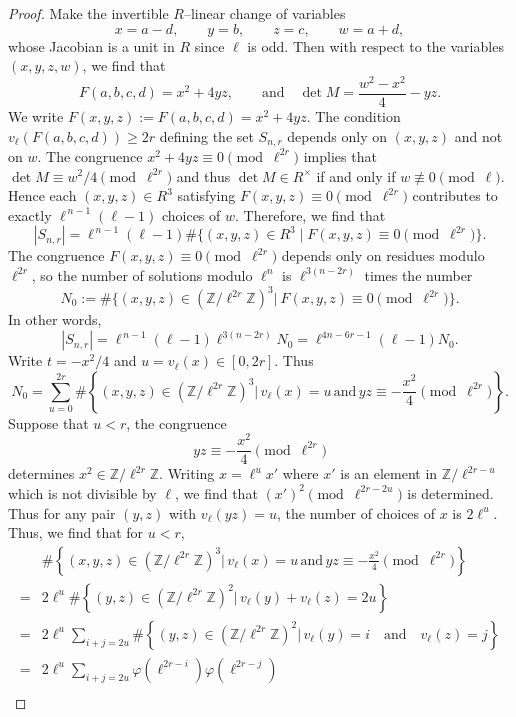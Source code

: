 \documentclass[10pt,a4paper]{amsart}
\newcommand{\Z}{\mathbb{Z}}
\begin{document}
\begin{proof}
Make the invertible $R$–linear change of variables
\[
x=a-d,\qquad y=b,\qquad z=c,\qquad w=a+d,
\]
whose Jacobian is a unit in $R$ since $\ell$ is odd. Then with respect to the variables $(x,y,z,w)$, we find that
\[
F(a,b,c,d)=x^2+4yz,
\qquad\text{and}\quad
\det M=\frac{w^2-x^2}{4}-yz.
\]
We write $F(x,y,z):=F(a,b,c,d)=x^2+4yz$. The condition $v_\ell\left(F(a,b,c,d)\right)\ge2r$ defining the set $S_{n,r}$ depends only on $(x,y,z)$ and not on $w$. The congruence $x^2+4yz\equiv0\pmod{\ell^{2r}}$ implies that $\det M\equiv w^2/4\pmod{\ell^{2r}}$ and thus $\det M\in R^\times$ if and only if $w\not\equiv0\pmod\ell$.  Hence each
$(x,y,z)\in R^3$ satisfying $F(x,y,z)\equiv 0\pmod{\ell^{2r}}$ contributes to exactly $\ell^{\,n-1}(\ell-1)$ choices of $w$. Therefore, we find that
\[|S_{n,r}|=\ell^{\,n-1}(\ell-1)\#\{(x,y,z)\in R^3\mid F(x,y,z)\equiv 0\pmod{\ell^{2r}}\}.\]
\noindent The congruence $F(x,y,z)\equiv0\pmod{\ell^{2r}}$ depends only on residues
modulo $\ell^{2r}$, so the number of solutions modulo $\ell^n$ is
$\ell^{3(n-2r)}$ times the number
\[
N_0:=\#\{(x,y,z)\in(\Z/\ell^{2r}\Z)^3|\ F(x,y,z)\equiv0\pmod{\ell^{2r}}\}.
\] 
\noindent In other words,
\[|S_{n,r}|=\ell^{\,n-1}(\ell-1)\ell^{3(n-2r)} N_0=\ell^{4n-6r-1}(\ell-1)N_0.\]
\noindent Write $t=-x^2/4$ and $u=v_\ell(x)\in [0,2r]$. Thus
\begin{equation}\label{N_0 eqn}N_0=\sum_{u=0}^{2r} \#\left\{(x,y,z)\in(\Z/\ell^{2r}\Z)^3|\, v_\ell(x)=u\,\text{and}\, yz\equiv -\frac{x^2}{4}\pmod{\ell^{2r}}\right\}.\end{equation}
Suppose that $u<r$, the congruence 
\[yz\equiv -\frac{x^2}{4}\pmod{\ell^{2r}}\]determines $x^2\in \Z/\ell^{2r}\Z$. Writing $x=\ell^ux'$ where $x'$ is an element in $\Z/\ell^{2r-u}$ which is not divisible by $\ell$, we find that $(x')^2\pmod{\ell^{2r-2u}}$ is determined. Thus for any pair $(y,z)$ with $v_\ell(yz)=u$, the number of choices of $x$ is $2\ell^u$. Thus, we find that for $u<r$,
\begin{equation}\label{u<r eqn}\begin{split}&\#\left\{(x,y,z)\in(\Z/\ell^{2r}\Z)^3|\, v_\ell(x)=u\,\text{and}\, yz\equiv -\frac{x^2}{4}\pmod{\ell^{2r}}\right\}\\
=&2\ell^u\#\left\{(y,z)\in(\Z/\ell^{2r}\Z)^2|\, v_\ell(y)+v_\ell(z)=2u\right\}\\
=& 2\ell^u\sum_{i+j=2u} \#\left\{(y,z)\in(\Z/\ell^{2r}\Z)^2|\, v_\ell(y)=i\quad\text{and}\quad v_\ell(z)=j\right\}\\
=& 2\ell^u\sum_{i+j=2u} \varphi(\ell^{2r-i})\varphi(\ell^{2r-j})\\

\end{split}
\end{equation}
\end{proof}
\end{document}
